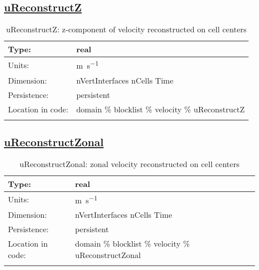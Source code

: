 \subsection[uReconstructZ]{\hyperref[sec:var_tab_velocity]{uReconstructZ}}
\label{subsec:var_sec_velocity_uReconstructZ}
\begin{center}
\begin{longtable}{| p{2.0in} | p{4.0in} |}
        \hline 
        Type: & real \\
        \hline 
        Units: & \si{m.s^{-1}} \\
        \hline 
        Dimension: & nVertInterfaces nCells Time \\
        \hline 
        Persistence: & persistent \\
        \hline 
         Location in code: & domain \% blocklist \% velocity \% uReconstructZ \\
         \hline 
    \caption{uReconstructZ: z-component of velocity reconstructed on cell centers}
\end{longtable}
\end{center}
\subsection[uReconstructZonal]{\hyperref[sec:var_tab_velocity]{uReconstructZonal}}
\label{subsec:var_sec_velocity_uReconstructZonal}
\begin{center}
\begin{longtable}{| p{2.0in} | p{4.0in} |}
        \hline 
        Type: & real \\
        \hline 
        Units: & \si{m.s^{-1}} \\
        \hline 
        Dimension: & nVertInterfaces nCells Time \\
        \hline 
        Persistence: & persistent \\
        \hline 
         Location in code: & domain \% blocklist \% velocity \% uReconstructZonal \\
         \hline 
    \caption{uReconstructZonal: zonal velocity reconstructed on cell centers}
\end{longtable}
\end{center}
